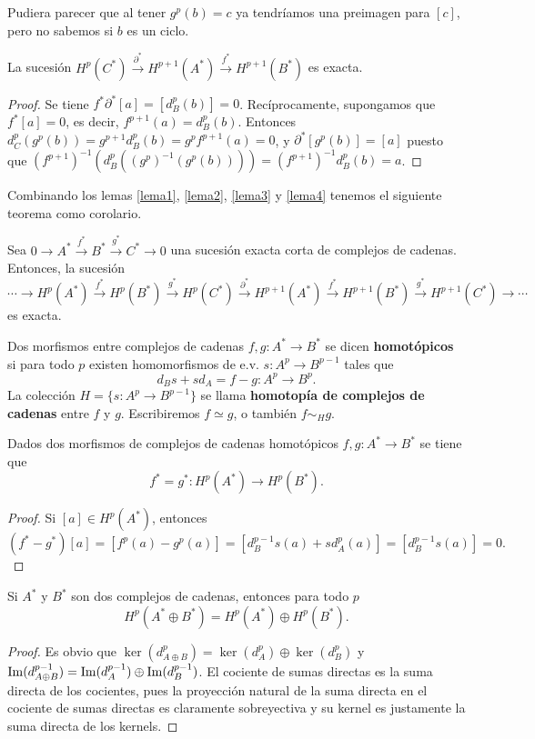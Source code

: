 \documentclass[CV.tex]{subfiles}
\begin{document}
\begin{nota}
Pudiera parecer que al tener $g^p(b)=c$ ya tendríamos una preimagen para $[c]$, pero no sabemos si $b$ es un ciclo.
\end{nota}

\begin{lemma}\label{lema4}
La sucesión $H^p(C^*)\overset{\partial^*}{\to}H^{p+1}(A^*)\overset{f^*}{\to} H^{p+1}(B^*)$ es exacta.
\end{lemma}
\begin{proof}
Se tiene $f^*\partial^*[a]=[d_B^p(b)]=0$. Recíprocamente, supongamos que $f^*[a]=0$, es decir, $f^{p+1}(a)=d_B^p(b)$. Entonces $d_C^p(g^p(b))=g^{p+1}d_B^p(b)=g^pf^{p+1}(a)=0$, y $\partial^*[g^p(b)]=[a]$ puesto que $(f^{p+1})^{-1}(d_B^p((g^p)^{-1}(g^p(b))))=(f^{p+1})^{-1}d_B^p(b)=a$.
\end{proof}

Combinando los lemas \ref{lema1}, \ref{lema2}, \ref{lema3} y \ref{lema4} tenemos el siguiente teorema como corolario.

\begin{teorema}
Sea $0\to A^*\overset{f^*}{\to}B^*\overset{g^*}{\to}C^*\to 0$ una sucesión exacta corta de complejos de cadenas. Entonces, la sucesión
\[
\cdots\to H^p(A^*)\overset{f^*}{\to}H^p(B^*)\overset{g^*}{\to}H^p(C^*)\overset{\partial^*}{\to}  H^{p+1}(A^*)\overset{f^*}{\to}H^{p+1}(B^*)\overset{g^*}{\to}H^{p+1}(C^*)\to\cdots
\]
es exacta.
\end{teorema}

\begin{defi}
Dos morfismos entre complejos de cadenas $f,g:A^*\to B^*$ se dicen \textbf{homotópicos} si para todo $p$ existen homomorfismos de e.v. $s:A^p\to B^{p-1}$
tales que
\[
d_Bs+sd_A=f-g:A^p\to B^p.
\]
La colección $H=\{s:A^p\to B^{p-1}\}$ se llama \textbf{homotopía de complejos de cadenas} entre $f$ y $g$. Escribiremos $f\simeq g$, o también $f\sim_H g$.
\end{defi}

\begin{lemma}
Dados dos morfismos de complejos de cadenas homotópicos $f,g:A^*\to B^*$ se tiene que
\[
f^*=g^*:H^p(A^*)\to H^p(B^*).
\]
\end{lemma}
\begin{proof}
Si $[a]\in H^p(A^*)$, entonces
\[
(f^*-g^*)[a]=[f^p(a)-g^p(a)]=[d_B^{p-1}s(a)+sd_A^p(a)]=[d_B^{p-1}s(a)]=0.
\]
\end{proof}

\begin{lemma}
Si $A^*$ y $B^*$ son dos complejos de cadenas, entonces para todo $p$
\[
H^p(A^*\oplus B^*)=H^p(A^*)\oplus H^p(B^*).
\]
\end{lemma}
\begin{proof}
Es obvio que $\ker(d^p_{A\oplus B})=\ker(d^p_A)\oplus \ker(d^p_B)$ y $\operatorname{Im}(d^{p-1}_{A\oplus B})=\operatorname{Im}(d^{p-1}_A)\oplus \operatorname{Im}(d^{p-1}_B)$. El cociente de sumas directas es la suma directa de los cocientes, pues la proyección natural de la suma directa en el cociente de sumas directas es claramente sobreyectiva y su kernel es justamente la suma directa de los kernels.
\end{proof}
\end{document}
